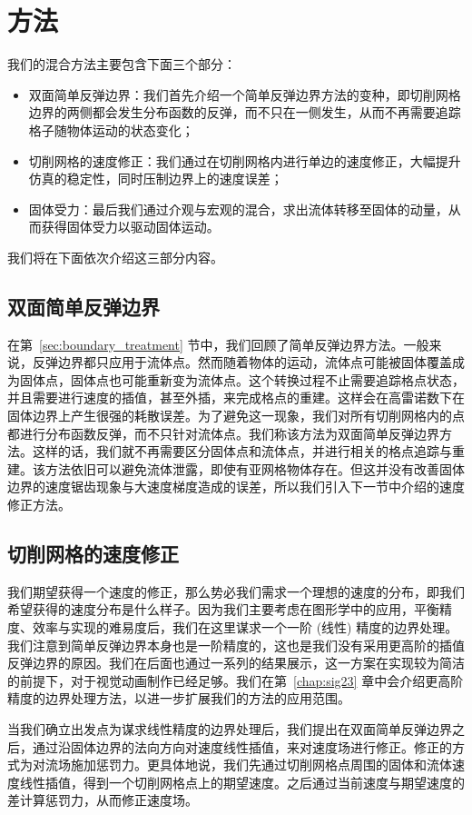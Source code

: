 \section{方法}
我们的混合方法主要包含下面三个部分：
\begin{itemize}
\item 双面简单反弹边界：我们首先介绍一个简单反弹边界方法的变种，即切削网格边界的两侧都会发生分布函数的反弹，而不只在一侧发生，从而不再需要追踪格子随物体运动的状态变化；
\item 切削网格的速度修正：我们通过在切削网格内进行单边的速度修正，大幅提升仿真的稳定性，同时压制边界上的速度误差；
\item 固体受力：最后我们通过介观与宏观的混合，求出流体转移至固体的动量，从而获得固体受力以驱动固体运动。
\end{itemize}

我们将在下面依次介绍这三部分内容。

\subsection{双面简单反弹边界}
在第~\ref{sec:boundary_treatment} 节中，我们回顾了简单反弹边界方法。一般来说，反弹边界都只应用于流体点。然而随着物体的运动，流体点可能被固体覆盖成为固体点，固体点也可能重新变为流体点。这个转换过程不止需要追踪格点状态，并且需要进行速度的插值，甚至外插，来完成格点的重建。这样会在高雷诺数下在固体边界上产生很强的耗散误差。为了避免这一现象，我们对所有切削网格内的点都进行分布函数反弹，而不只针对流体点。我们称该方法为双面简单反弹边界方法。这样的话，我们就不再需要区分固体点和流体点，并进行相关的格点追踪与重建。该方法依旧可以避免流体泄露，即使有亚网格物体存在。但这并没有改善固体边界的速度锯齿现象与大速度梯度造成的误差，所以我们引入下一节中介绍的速度修正方法。

\subsection{切削网格的速度修正}
我们期望获得一个速度的修正，那么势必我们需求一个理想的速度的分布，即我们希望获得的速度分布是什么样子。因为我们主要考虑在图形学中的应用，平衡精度、效率与实现的难易度后，我们在这里谋求一个一阶 (线性) 精度的边界处理。我们注意到简单反弹边界本身也是一阶精度的，这也是我们没有采用更高阶的插值反弹边界的原因。我们在后面也通过一系列的结果展示，这一方案在实现较为简洁的前提下，对于视觉动画制作已经足够。我们在第~\ref{chap:sig23} 章中会介绍更高阶精度的边界处理方法，以进一步扩展我们的方法的应用范围。

当我们确立出发点为谋求线性精度的边界处理后，我们提出在双面简单反弹边界之后，通过沿固体边界的法向方向对速度线性插值，来对速度场进行修正。修正的方式为对流场施加惩罚力。更具体地说，我们先通过切削网格点周围的固体和流体速度线性插值，得到一个切削网格点上的期望速度。之后通过当前速度与期望速度的差计算惩罚力，从而修正速度场。

